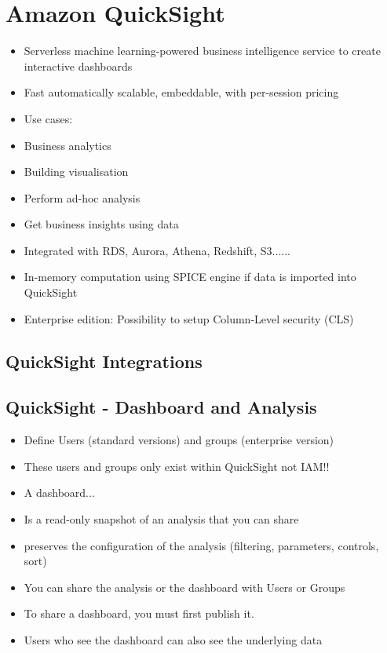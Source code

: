 

\section{Amazon QuickSight}
\begin{itemize}
    \item Serverless machine learning-powered business intelligence service to create interactive dashboards
    \item Fast automatically scalable, embeddable, with per-session pricing
    \item Use cases:
    \item Business analytics
    \item Building visualisation
    \item Perform ad-hoc analysis
    \item Get business insights using data
    \item Integrated with RDS, Aurora, Athena, Redshift, S3......
    \item In-memory computation using SPICE engine if data is imported into QuickSight
    \item Enterprise edition: Possibility to setup Column-Level security (CLS)
\end{itemize}

\subsection{QuickSight Integrations}

\subsection{QuickSight - Dashboard and Analysis}
\begin{itemize}
    \item Define Users (standard versions) and groups (enterprise version)
    \item These users and groups only exist within QuickSight not IAM!!
    \item A dashboard...
    \item Is a read-only snapshot of an analysis that you can share
    \item preserves the configuration of the analysis (filtering, parameters, controls, sort)
    \item You can share the analysis or the dashboard with Users or Groups
    \item To share a dashboard, you must first publish it.
    \item Users who see the dashboard can also see the underlying data
\end{itemize}


